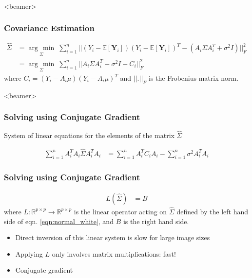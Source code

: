 \documentclass{beamer}
\newcommand{\argmin}[1]{\underset{#1}{\operatorname{arg}\,\operatorname{min}}\;}
\begin{document}
\begin{frame}<beamer>
\frametitle{Covariance Estimation}
\begin{equation}
\begin{aligned}
\hat\Sigma 
&= \argmin{\Sigma} \sum_{i=1}^n || (Y_i - \mathbb{E}[\textbf{Y}_i]) (Y_i - \mathbb{E}[\textbf{Y}_i])^T
- (A_i \Sigma A_i^T + \sigma^2 I)||_F^2 \\
&= \argmin{\Sigma} \sum_{i=1}^n || A_i\Sigma A_i^T + \sigma^2 I - C_i  ||_F^2 
\end{aligned}
\label{eqn:ls1}
\end{equation}
where $C_i=(Y_i - A_i \mu) (Y_i - A_i \mu)^T$ and $||.||_F$ is the Frobenius matrix norm. 
\end{frame}


\begin{frame}<beamer>
\frametitle{Solving using Conjugate Gradient}
System of linear equations for the elements of the matrix $\hat \Sigma$

\begin{equation}
\begin{aligned}
\sum_{i=1}^n  A_i^T  A_i \hat \Sigma A_i^T A_i
&= \sum_{i=1}^n A_i^T C_i A_i - \sum_{i=1}^n \sigma^2 A_i^T A_i 
\end{aligned}
\label{eqn:normal_white}
\end{equation}
\frametitle{Solving using Conjugate Gradient}
\begin{equation}
\begin{aligned}
L(\hat\Sigma) 
&=  B 
\label{eqn:cg}
\end{aligned}
\end{equation}
where $L:\mathbb{R}^{p\times p} \to \mathbb{R}^{p\times p}$ is the linear operator acting on $\hat{\Sigma}$ defined by the left hand side of eqn. \ref{eqn:normal_white}, and $B$ is the right hand side.

\begin{itemize}
 \item Direct inversion of this linear system is slow for large image sizes
 \item Applying $L$ only involves matrix multiplications: fast!
 \item Conjugate gradient 
\end{itemize}

\end{frame}
\end{document}
